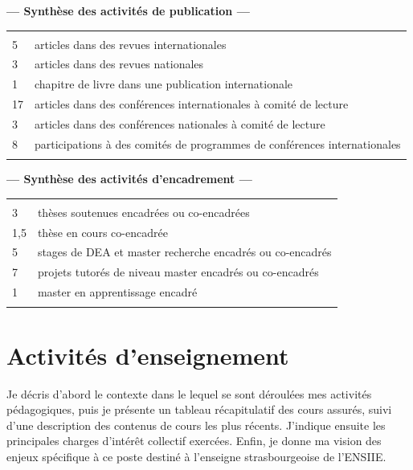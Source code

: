 \documentclass[11pt]{article}
\begin{document}
\begin{center}
	\textbf{--- Synthèse des activités de publication ---}\\[1mm]
\begin{tabular}{ll}
	\hline\\[-2mm]
	5	&	articles dans des revues internationales\\
	3	&	articles dans des revues nationales\\
	1	&	chapitre de livre dans une publication internationale\\
	17	& 	articles dans des conférences internationales à comité de lecture\\
	3	&	articles dans des conférences nationales à comité de lecture\\
	8	& 	participations à des comités de programmes de conférences internationales\\
	\hline\\
\end{tabular}


	\textbf{--- Synthèse des activités d'encadrement ---}\\[1mm]
\begin{tabular}{ll}
	\hline\\[-2mm]
	3	&	thèses soutenues encadrées ou co-encadrées\\
	1,5	& 	thèse en cours co-encadrée\\
	5	&	stages de DEA et master recherche encadrés ou co-encadrés\\
	7	& 	projets tutorés de niveau master encadrés ou co-encadrés\\
	1	& 	master en apprentissage encadré\\
	\hline\\
\end{tabular}

\end{center}



\newpage

\section{Activités d'enseignement}
\label{sc:ensgnt-univ}

Je décris d'abord le contexte dans le lequel se sont déroulées mes activités
pédagogiques, puis je présente un tableau récapitulatif des cours assurés, suivi
d'une description des contenus de cours les plus récents. J'indique ensuite les
principales charges d'intérêt collectif exercées. Enfin, je donne ma vision 
des enjeux spécifique à ce poste destiné à l'enseigne strasbourgeoise de l'ENSIIE.
\end{document}
